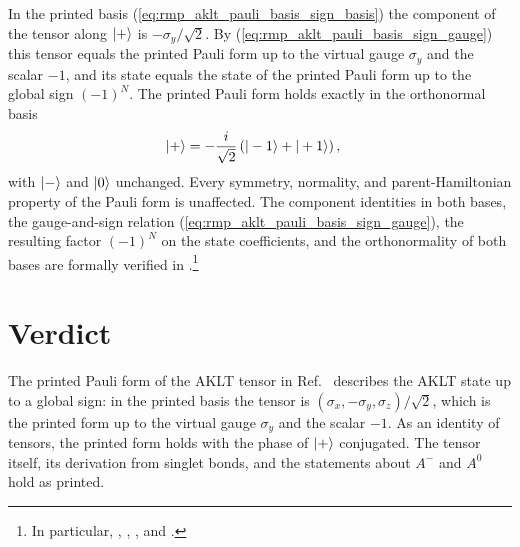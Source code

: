 \documentclass{article}
\begin{document}
In the printed basis (\ref{eq:rmp_aklt_pauli_basis_sign_basis}) the component
of the tensor along $|+\rangle$ is $-\sigma_y/\sqrt2$. By
(\ref{eq:rmp_aklt_pauli_basis_sign_gauge}) this tensor equals the printed
Pauli form up to the virtual gauge $\sigma_y$ and the scalar $-1$, and its
state equals the state of the printed Pauli form up to the global sign
$(-1)^N$. The printed Pauli form holds exactly in the orthonormal basis
\begin{align}
    |+\rangle
        &=-\frac{i}{\sqrt2}\left(|-1\rangle+|+1\rangle\right),
    \label{eq:rmp_aklt_pauli_basis_sign_corrected}
\end{align}
with $|-\rangle$ and $|0\rangle$ unchanged. Every symmetry, normality, and
parent-Hamiltonian property of the Pauli form is unaffected. The component
identities in both bases, the gauge-and-sign relation
(\ref{eq:rmp_aklt_pauli_basis_sign_gauge}), the resulting factor $(-1)^N$
on the state coefficients, and the orthonormality of both bases are formally
verified in .\footnote{In particular,
,
,
, and
.}

\section{Verdict}

The printed Pauli form of the AKLT tensor in Ref.~\cite{Cirac2021Matrix}
describes the AKLT state up to a global sign: in the printed basis the
tensor is $(\sigma_x,-\sigma_y,\sigma_z)/\sqrt2$, which is the printed form
up to the virtual gauge $\sigma_y$ and the scalar $-1$. As an identity of
tensors, the printed form holds with the phase of $|+\rangle$ conjugated. The
tensor itself, its derivation from singlet bonds, and the statements about
$A^-$ and $A^0$ hold as printed.



\end{document}
